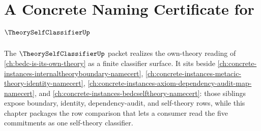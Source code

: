 \chapter{A Concrete Naming Certificate for $\TheorySelfClassifierUp$}
\label{ch:concrete-instances-theoryselfclassifier-namecert}

The $\TheorySelfClassifierUp$ packet realizes the own-theory reading of \autoref{ch:bedc-is-its-own-theory} as a finite classifier surface. It sits beside \autoref{ch:concrete-instances-internaltheoryboundary-namecert}, \autoref{ch:concrete-instances-metacic-theory-identity-namecert}, \autoref{ch:concrete-instances-axiom-dependency-audit-map-namecert}, and \autoref{ch:concrete-instances-bedcselftheory-namecert}: those siblings expose boundary, identity, dependency-audit, and self-theory rows, while this chapter packages the row comparison that lets a consumer read the five commitments as one self-theory classifier.


